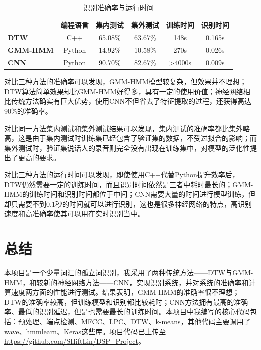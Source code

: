\documentclass[UTF8]{article}
\begin{document}
\begin{table}[htbp]
	\centering
	\begin{tabular}{|l|c|c|c|c|c|}
		\hline
		                 & \textbf{编程语言} & \textbf{集内测试} & \textbf{集外测试} & \textbf{训练时间} & \textbf{识别时间} \\
		\hline
		\textbf{DTW}     & C++                   & 65.08\%               & 63.67\%               & 148s                  & 0.165s                \\
		\hline
		\textbf{GMM-HMM} & Python                & 14.92\%               & 10.58\%               & 270s                  & 0.026s                \\
		\hline
		\textbf{CNN}     & Python                & 90.70\%               & 82.67\%               & >4000s                & 0.009s                \\
		\hline
	\end{tabular}
	\caption{\label{tab:results}识别准确率与运行时间}
\end{table}

对比三种方法的准确率可以发现，GMM-HMM模型较复杂，但效果并不理想；DTW算法简单效果却比GMM-HMM好得多，具有一定的使用价值；神经网络相比传统方法确实有巨大优势，使用CNN不但省去了特征提取的过程，还获得高达90\%的准确率。

对比同一方法集内测试和集外测试结果可以发现，集内测试的准确率都比集外略高，这是由于集内测试时训练集已经包含了验证集的数据，不受过拟合的影响；而集外测试时，验证集说话人的录音则完全没有出现在训练集中，对模型的泛化性提出了更高的要求。

对比三种方法的运行时间可以发现，即使使用C++代替Python提升效率后，DTW仍然需要一定的训练时间，而且识别时间依然是三者中耗时最长的；GMM-HMM的训练时间和识别时间都位于中间；CNN需要大量的时间进行模型训练，但却只需要不到0.1秒的时间就可以进行识别，这也是很多神经网络的特点，高识别速度和高准确率使其可以用在实时识别当中。

\section{总结}
本项目是一个少量词汇的孤立词识别，我采用了两种传统方法——DTW与GMM-HMM，和较新的神经网络方法——CNN，实现识别系统，并对系统的准确率和计算速度两方面的性能进行测试。结果表明，GMM-HMM的准确率很不理想；DTW的准确率较高，但训练模型和识别都比较耗时；CNN方法拥有最高的准确率、最低的识别延迟，但是也需要最长的训练时间。本项目中我编写的核心代码包括：预处理、端点检测、MFCC、LPC、DTW、k-means，其他代码主要调用了wave、hmmlearn、Keras这些库。项目代码已上传至\url{https://github.com/SHiftLin/DSP_Project}。



\end{document}
